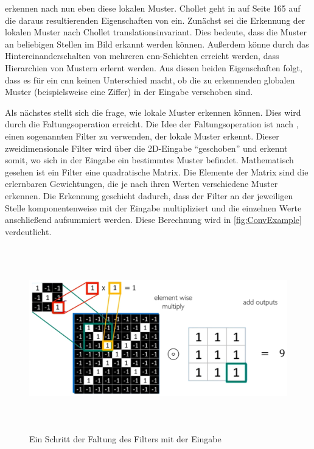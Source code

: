  erkennen nach \cite[S. 164]{DeepLearningPythonKeras} nun eben diese lokalen Muster.
Chollet geht in \cite{DeepLearningPythonKeras} auf Seite 165 auf die daraus resultierenden Eigenschaften von  ein.
Zunächst sei die Erkennung der lokalen Muster nach Chollet translationsinvariant.
Dies bedeute, dass die Muster an beliebigen Stellen im Bild erkannt werden können.
Außerdem könne durch das Hintereinanderschalten von mehreren \acrshort{cnn}-Schichten erreicht werden, dass Hierarchien von Mustern erlernt werden.
Aus diesen beiden Eigenschaften folgt, dass es für ein \acrshort{cnn} keinen Unterschied macht, ob die zu erkennenden globalen Muster (beispielsweise eine Ziffer) in der Eingabe verschoben sind.

Als nächstes stellt sich die frage, wie  lokale Muster erkennen können.
Dies wird durch die Faltungsoperation erreicht.
Die Idee der Faltungsoperation ist nach \cite{6S191CNN}, einen sogenannten Filter zu verwenden, der lokale Muster erkennt.
Dieser zweidimensionale Filter wird über die 2D-Eingabe "`geschoben"' und erkennt somit, wo sich in der Eingabe ein bestimmtes Muster befindet.
Mathematisch gesehen ist ein Filter eine quadratische Matrix.
Die Elemente der Matrix sind die erlernbaren Gewichtungen, die je nach ihren Werten verschiedene Muster erkennen.
Die Erkennung geschieht dadurch, dass der Filter an der jeweiligen Stelle komponentenweise mit der Eingabe multipliziert und die einzelnen Werte anschließend aufsummiert werden.
Diese Berechnung wird in \autoref{fig:ConvExample} verdeutlicht.

\begin{figure}[h]
    \centering
    \includegraphics[width=1.0\textwidth,height=8cm,keepaspectratio=true]{content/images/ConvExample.png}
    \caption{Ein Schritt der Faltung des Filters mit der Eingabe \cite{6S191CNN}}
    \label{fig:ConvExample}
\end{figure}

